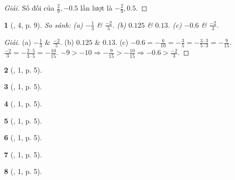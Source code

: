 \documentclass{article}
\newtheorem{baitoan}{}
\begin{document}
\begin{proof}[Giải]
	Số đối của $\frac{2}{9},-0.5$ lần lượt là $-\frac{2}{9},0.5$.
\end{proof}

\begin{baitoan}[\cite{SGK_Toan_7_Canh_Dieu_tap_1}, 4, p. 9]
	So sánh: (a) $-\frac{1}{3}$ \& $\frac{-2}{5}$. (b) $0.125$ \& $0.13$. (c) $-0.6$ \& $\frac{-2}{3}$.
\end{baitoan}

\begin{proof}[Giải]
	(a) $-\frac{1}{3}$ \& $\frac{-2}{5}$. (b) $0.125$ \& $0.13$. (c) $-0.6 = -\frac{6}{10} = -\frac{3}{5} = -\frac{3\cdot3}{5\cdot3} = -\frac{9}{15}$. $\frac{-2}{3} = -\frac{2\cdot5}{3\cdot5} = -\frac{10}{15}$. $-9 > -10\Rightarrow-\frac{9}{15} > -\frac{10}{15}\Rightarrow-0.6 > \frac{-2}{3}$.
\end{proof}

\begin{baitoan}[\cite{SGK_Toan_7_Canh_Dieu_tap_1}, 1, p. 5]
	
\end{baitoan}

\begin{baitoan}[\cite{SGK_Toan_7_Canh_Dieu_tap_1}, 1, p. 5]
	
\end{baitoan}

\begin{baitoan}[\cite{SGK_Toan_7_Canh_Dieu_tap_1}, 1, p. 5]
	
\end{baitoan}

\begin{baitoan}[\cite{SGK_Toan_7_Canh_Dieu_tap_1}, 1, p. 5]
	
\end{baitoan}

\begin{baitoan}[\cite{SGK_Toan_7_Canh_Dieu_tap_1}, 1, p. 5]
	
\end{baitoan}

\begin{baitoan}[\cite{SGK_Toan_7_Canh_Dieu_tap_1}, 1, p. 5]
	
\end{baitoan}

\begin{baitoan}[\cite{SGK_Toan_7_Canh_Dieu_tap_1}, 1, p. 5]
	
\end{baitoan}
\end{document}
